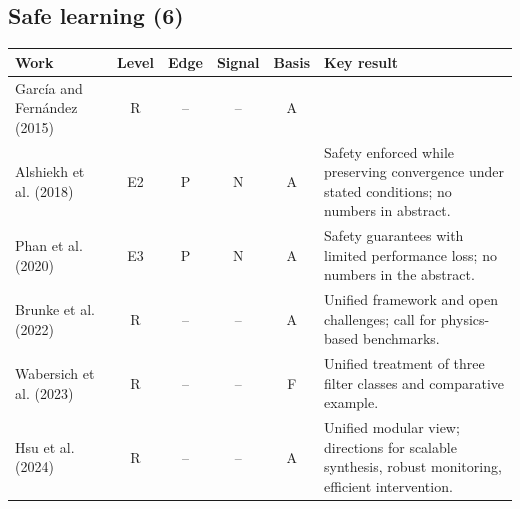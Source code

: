 \documentclass[10pt,a4paper]{article}
\begin{document}
\subsection*{Safe learning (6)}
\begin{longtable}{@{}>{\raggedright\arraybackslash}p{4.0cm}cccc>{\raggedright\arraybackslash}p{7.6cm}@{}}
\toprule \textbf{Work} & \textbf{Level} & \textbf{Edge} & \textbf{Signal} & \textbf{Basis} & \textbf{Key result} \\ \midrule \endhead
García and Fernández (2015)~\cite{Garcia2015} & R & -- & -- & A &  \\
Alshiekh et al. (2018)~\cite{Alshiekh2018} & E2 & P & N & A & Safety enforced while preserving convergence under stated conditions; no numbers in abstract. \\
Phan et al. (2020)~\cite{Phan2020} & E3 & P & N & A & Safety guarantees with limited performance loss; no numbers in the abstract. \\
Brunke et al. (2022)~\cite{Brunke2022} & R & -- & -- & A & Unified framework and open challenges; call for physics-based benchmarks. \\
Wabersich et al. (2023)~\cite{Wabersich2023} & R & -- & -- & F & Unified treatment of three filter classes and comparative example. \\
Hsu et al. (2024)~\cite{Hsu2024} & R & -- & -- & A & Unified modular view; directions for scalable synthesis, robust monitoring, efficient intervention. \\
\bottomrule\end{longtable}
\end{document}
